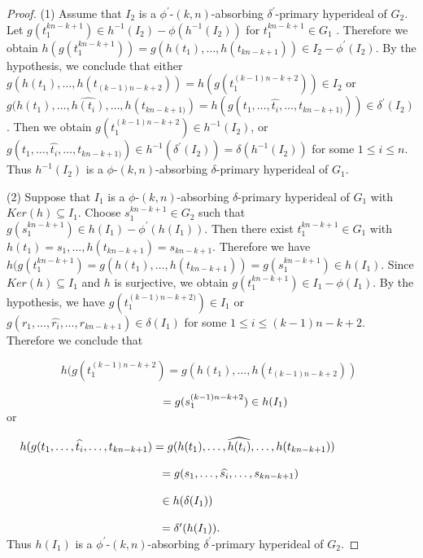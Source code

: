 \documentclass[preprint,review,10pt]{amsart}
\theoremstyle{definition}
\theoremstyle{remark}
\numberwithin{equation}{section}
\begin{document}
\begin{proof}
(1) Assume that $I_2$ is a $\phi^{\prime}$-$(k,n)$-absorbing $\delta^{\prime}$-primary hyperideal of $G_2$. Let $g(t_1^{kn-k+1}) \in h^{-1}(I_2)-\phi(h^{-1}(I_2))$ for $t_1^{kn-k+1} \in G_1$  . Therefore we obtain $h(g(t_1^{kn-k+1}))=g(h(t_1),\ldots,h(t_{kn-k+1})) \in I_2-\phi^{\prime}(I_2)$. By the hypothesis, we conclude that either $g(h(t_1),\ldots,h(t_{(k-1)n-k+2}))=h(g(t_1^{(k-1)n-k+2})) \in I_2$ or 
 $g(h(t_1),\ldots,\widehat{h(t_i)},\ldots,h(t_{kn-k+1)})=h(g(t_1,\ldots,\widehat{t_i},\ldots,t_{kn-k+1)})) \in \delta^{\prime}(I_2)$. Then we obtain  $g(t_1^{(k-1)n-k+2}) \in h^{-1}(I_2)$, 
 or $g(t_1,\ldots,\widehat{t_i},\ldots,t_{kn-k+1)}) \in h^{-1}(\delta^{\prime}(I_2))=\delta(h^{-1}(I_2))$ for some $1 \leq i \leq n$. Thus $h^{-1}(I_2)$ is a $\phi$-$(k,n)$-absorbing $\delta$-primary hyperideal of $G_1$.
 
 
 (2) Suppose that $I_1$ is a $\phi$-$(k,n)$-absorbing $\delta$-primary hyperideal of $G_1$ with $Ker (h) \subseteq I_1$.  Choose $s_1^{kn-k+1} \in G_2$ such that $g(s_1^{kn-k+1}) \in h(I_1)-\phi^{\prime}(h(I_1))$. Then  there exist $t_1^{kn-k+1} \in G_1$ with $h(t_1)=s_1, \ldots, h(t_{kn-k+1})=s_{kn-k+1}$. Therefore we have  $h(g(t_1^{kn-k+1})=g(h(t_1),\ldots,h(t_{kn-k+1}))=g(s_1^{kn-k+1}) \in h(I_1)$. Since  $Ker (h) \subseteq I_1$ and  $h$ is surjective,  we obtain $g(t_1^{kn-k+1}) \in I_1-\phi(I_1)$. By the hypothesis,  we have $g(t_1^{(k-1)n-k+2)}) \in I_1$ or $g(r_1,\ldots,\widehat{r_i},\ldots,r_{kn-k+1}) \in \delta(I_1)$ for some $1 \leq i \leq (k-1)n-k+2$. Therefore we conclude that
 
$ \hspace{2cm}h(g(t_1^{(k-1)n-k+2})=g(h(t_1),\ldots,h(t_{(k-1)n-k+2})) $

$\hspace{4.8cm}=g(s_1^{(k-1)n-k+2}) \in h(I_1)$\\ or 

 $\hspace{0.4cm}h(g(t_1,\ldots,\widehat{t_i},\ldots,t_{kn-k+1})=g(h(t_1),\ldots,\widehat{h(t_i)},\ldots,h(t_{kn-k+1}))$
 
 $\hspace{4.8cm}=g(s_1,\ldots,\widehat{s_i},\ldots,s_{kn-k+1})$
 
 $\hspace{4.8cm} \in h(\delta(I_1))$
 
 $\hspace{4.8cm}=\delta^{\prime}(h(I_1)).$\\  Thus  $h(I_1)$ is a $\phi^{\prime}$-$(k,n)$-absorbing $\delta^{\prime}$-primary hyperideal of $G_2$.
\end{proof}
\end{document}
